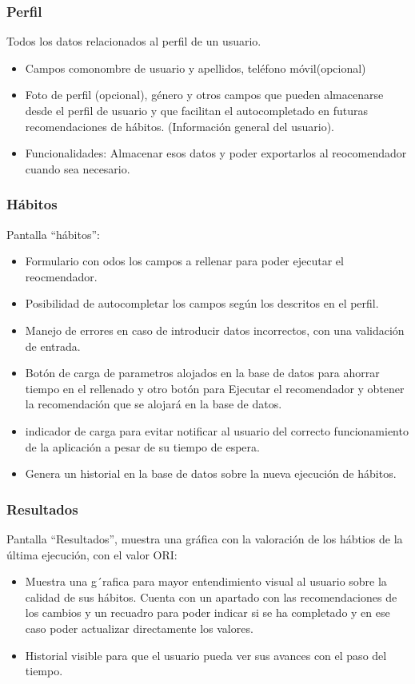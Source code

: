 \subsubsection{Perfil}
Todos los datos relacionados al perfil de un usuario.

\begin{itemize}
    \item Campos comonombre de usuario y apellidos, teléfono móvil(opcional)
    \item Foto de perfil (opcional), género y otros campos que pueden almacenarse desde el perfil de usuario y que facilitan el autocompletado en futuras recomendaciones de hábitos. (Información general del usuario).
    \item Funcionalidades:  Almacenar esos datos y poder exportarlos al reocomendador cuando sea necesario.
\end{itemize}

\subsubsection{Hábitos}
Pantalla ``hábitos'':
\begin{itemize}
    \item Formulario con odos los campos a rellenar para poder ejecutar el reocmendador.
    \item Posibilidad de autocompletar los campos según los descritos en el perfil.
    \item Manejo de errores en caso de introducir datos incorrectos, con una validación de entrada.
    \item Botón de carga de parametros alojados en la base de datos para ahorrar tiempo en el rellenado y otro botón para Ejecutar el recomendador y obtener la recomendación que se alojará en la base de datos.
    \item indicador de carga para evitar notificar al usuario del correcto funcionamiento de la aplicación a pesar de su tiempo de espera.
    \item Genera un historial en la base de datos sobre la nueva ejecución de hábitos.
\end{itemize}

\subsubsection{Resultados}
Pantalla ``Resultados'', muestra una gráfica con la valoración de los hábtios de la última ejecución, con el valor ORI:
\begin{itemize}
    \item Muestra una g´rafica para mayor entendimiento visual al usuario sobre la calidad de sus hábitos. Cuenta con un apartado con las recomendaciones de los cambios y un recuadro para poder indicar si se ha completado  y en ese caso poder actualizar directamente los valores.
    \item Historial visible para que el usuario pueda ver sus avances con el paso del tiempo.
\end{itemize}

